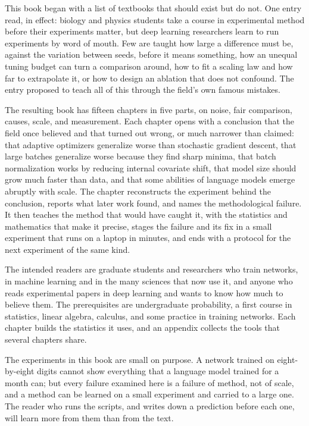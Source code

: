 
This book began with a list of textbooks that should exist but do not. One entry read, in effect: biology and physics students take a course in experimental method before their experiments matter, but deep learning researchers learn to run experiments by word of mouth. Few are taught how large a difference must be, against the variation between seeds, before it means something, how an unequal tuning budget can turn a comparison around, how to fit a scaling law and how far to extrapolate it, or how to design an ablation that does not confound. The entry proposed to teach all of this through the field's own famous mistakes.

The resulting book has fifteen chapters in five parts, on noise, fair comparison, causes, scale, and measurement. Each chapter opens with a conclusion that the field once believed and that turned out wrong, or much narrower than claimed: that adaptive optimizers generalize worse than stochastic gradient descent, that large batches generalize worse because they find sharp minima, that batch normalization works by reducing internal covariate shift, that model size should grow much faster than data, and that some abilities of language models emerge abruptly with scale. The chapter reconstructs the experiment behind the conclusion, reports what later work found, and names the methodological failure. It then teaches the method that would have caught it, with the statistics and mathematics that make it precise, stages the failure and its fix in a small experiment that runs on a laptop in minutes, and ends with a protocol for the next experiment of the same kind.

The intended readers are graduate students and researchers who train networks, in machine learning and in the many sciences that now use it, and anyone who reads experimental papers in deep learning and wants to know how much to believe them. The prerequisites are undergraduate probability, a first course in statistics, linear algebra, calculus, and some practice in training networks. Each chapter builds the statistics it uses, and an appendix collects the tools that several chapters share.

The experiments in this book are small on purpose. A network trained on eight-by-eight digits cannot show everything that a language model trained for a month can; but every failure examined here is a failure of method, not of scale, and a method can be learned on a small experiment and carried to a large one. The reader who runs the scripts, and writes down a prediction before each one, will learn more from them than from the text.

